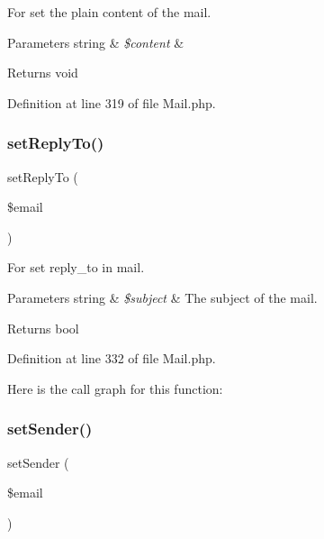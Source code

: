 For set the plain content of the mail.


\begin{DoxyParams}[1]{Parameters}
string & {\em \$content} & \\
\hline
\end{DoxyParams}
\begin{DoxyReturn}{Returns}
void 
\end{DoxyReturn}


Definition at line 319 of file Mail.\+php.

\mbox{\label{class_zest_1_1_mail_1_1_mail_a18845dc0e743855fef7e3fd8a2375f4b}} 
\subsubsection{\texorpdfstring{set\+Reply\+To()}{setReplyTo()}}
{\footnotesize\ttfamily set\+Reply\+To (\begin{DoxyParamCaption}\item[{}]{\$email }\end{DoxyParamCaption})}

For set reply\+\_\+to in mail.


\begin{DoxyParams}[1]{Parameters}
string & {\em \$subject} & The subject of the mail.\\
\hline
\end{DoxyParams}
\begin{DoxyReturn}{Returns}
bool 
\end{DoxyReturn}


Definition at line 332 of file Mail.\+php.

Here is the call graph for this function\+:
\mbox{\label{class_zest_1_1_mail_1_1_mail_a1a5cb2c6afc792ad117d5ba30e52b5de}} 
\subsubsection{\texorpdfstring{set\+Sender()}{setSender()}}
{\footnotesize\ttfamily set\+Sender (\begin{DoxyParamCaption}\item[{}]{\$email }\end{DoxyParamCaption})}

